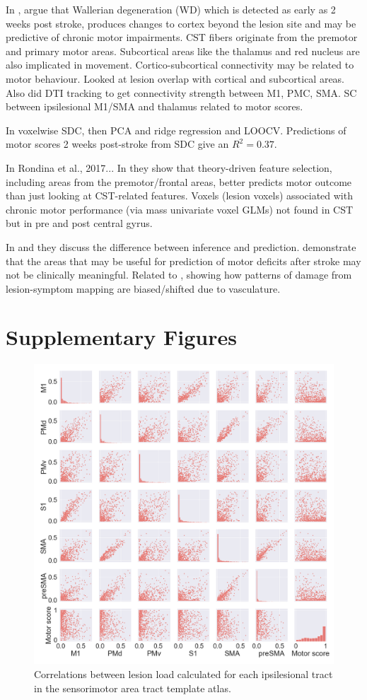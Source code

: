 \documentclass[10pt]{article}
\begin{document}
In \cite{Peters2018-tf}, argue that Wallerian degeneration (WD) which is detected as early as 2 weeks post stroke, produces changes to cortex beyond the lesion site and may be predictive of chronic motor impairments. CST fibers originate from the premotor and primary motor areas. Subcortical areas like the thalamus and red nucleus are also implicated in movement. Cortico-subcortical connectivity may be related to motor behaviour. Looked at lesion overlap with cortical and subcortical areas. Also did DTI tracking to get connectivity strength between M1, PMC, SMA. SC between ipsilesional M1/SMA and thalamus related to motor scores.  

In \cite{Salvalaggio2020-pe} voxelwise SDC, then PCA and ridge regression and LOOCV. Predictions of motor scores 2 weeks post-stroke from SDC give an $R^2 = 0.37$.

In Rondina et al., 2017...
In \cite{Rondina2016-ds} they show that theory-driven feature selection, including areas from the premotor/frontal areas, better predicts motor outcome than just looking at CST-related features. Voxels (lesion voxels) associated with chronic motor performance (via mass univariate voxel GLMs) not found in CST but in pre and post central gyrus.

In \cite{Sperber2021-lw} and \cite{Bzdok2020-py} they discuss the difference between inference and prediction.  \cite{Sperber2021-lw} demonstrate that the areas that may be useful for prediction of motor deficits after stroke may not be clinically meaningful. Related to \cite{Mah2014-cb}, showing how patterns of damage from lesion-symptom mapping are biased/shifted due to vasculature.

\clearpage

\newcommand{\beginsupplement}{%
\setcounter{table}{0}
\renewcommand{\thetable}{S\arabic{table}}%
\setcounter{figure}{0}
\renewcommand{\thefigure}{S\arabic{figure}}%
}

\printbibliography

\beginsupplement
\section*{Supplementary Figures}

\begin{figure}[]
\centering
\includegraphics[width=0.8\linewidth]{figures/SMATT_scatterplts.png}
\caption{Correlations between lesion load calculated for each ipsilesional tract in the sensorimotor area tract template atlas.}
\label{smatt_pairwise_correlations}
\end{figure}
\end{document}

